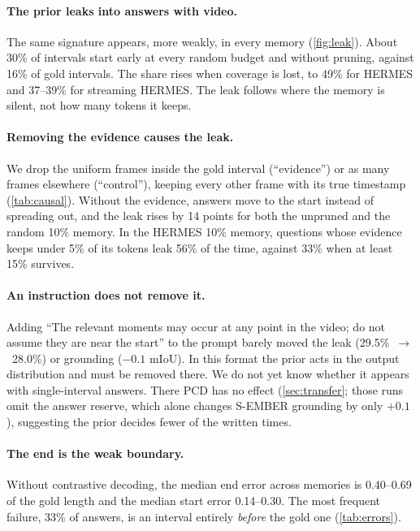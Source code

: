 \paragraph{The prior leaks into answers with video.}
The same signature appears, more weakly, in every memory (\cref{fig:leak}). About 30\% of intervals start early at
every random budget and without pruning, against 16\% of gold intervals. The share rises when coverage is lost, to
49\% for HERMES and 37--39\% for streaming HERMES. The leak follows where the memory is silent, not how many tokens
it keeps.

\paragraph{Removing the evidence causes the leak.}
We drop the uniform frames inside the gold interval (``evidence'') or as many frames elsewhere (``control''),
keeping every other frame with its true timestamp (\cref{tab:causal}). Without the evidence, answers move to the start
instead of spreading out, and the leak rises by 14 points for both the unpruned and the random 10\%
memory. In the HERMES 10\% memory, questions whose evidence keeps under 5\% of its tokens leak 56\% of the time,
against 33\% when at least 15\% survives.

\paragraph{An instruction does not remove it.}
Adding ``The relevant moments may occur at any point in the video; do not assume they are near the start'' to the
prompt barely moved the leak (29.5\%~$\rightarrow$~28.0\%) or grounding ($-0.1$ mIoU). In this format the prior acts
in the output distribution and must be removed there. We do not yet know whether it appears with single-interval
answers. There PCD has no effect (\cref{sec:transfer}; those runs omit the answer reserve, which alone changes S-EMBER
grounding by only $+0.1$), suggesting the prior decides fewer of the written times. 

\paragraph{The end is the weak boundary.}
Without contrastive decoding, the median end error across memories is 0.40--0.69 of the gold length and the
median start error 0.14--0.30. The most frequent failure, 33\% of answers, is an interval entirely \emph{before} the
gold one (\cref{tab:errors}).

